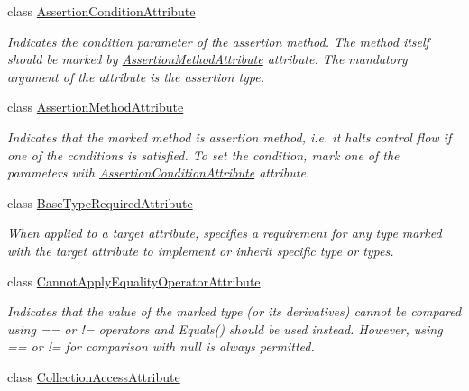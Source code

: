 \begin{DoxyCompactItemize}
\item 
class \mbox{\hyperlink{class_r_f_storage_1_1_assertion_condition_attribute}{Assertion\+Condition\+Attribute}}
\begin{DoxyCompactList}\small\item\em Indicates the condition parameter of the assertion method. The method itself should be marked by \mbox{\hyperlink{class_r_f_storage_1_1_assertion_method_attribute}{Assertion\+Method\+Attribute}} attribute. The mandatory argument of the attribute is the assertion type. \end{DoxyCompactList}\item 
class \mbox{\hyperlink{class_r_f_storage_1_1_assertion_method_attribute}{Assertion\+Method\+Attribute}}
\begin{DoxyCompactList}\small\item\em Indicates that the marked method is assertion method, i.\+e. it halts control flow if one of the conditions is satisfied. To set the condition, mark one of the parameters with \mbox{\hyperlink{class_r_f_storage_1_1_assertion_condition_attribute}{Assertion\+Condition\+Attribute}} attribute. \end{DoxyCompactList}\item 
class \mbox{\hyperlink{class_r_f_storage_1_1_base_type_required_attribute}{Base\+Type\+Required\+Attribute}}
\begin{DoxyCompactList}\small\item\em When applied to a target attribute, specifies a requirement for any type marked with the target attribute to implement or inherit specific type or types. \end{DoxyCompactList}\item 
class \mbox{\hyperlink{class_r_f_storage_1_1_cannot_apply_equality_operator_attribute}{Cannot\+Apply\+Equality\+Operator\+Attribute}}
\begin{DoxyCompactList}\small\item\em Indicates that the value of the marked type (or its derivatives) cannot be compared using \textquotesingle{}==\textquotesingle{} or \textquotesingle{}!=\textquotesingle{} operators and {\ttfamily Equals()} should be used instead. However, using \textquotesingle{}==\textquotesingle{} or \textquotesingle{}!=\textquotesingle{} for comparison with {\ttfamily null} is always permitted. \end{DoxyCompactList}\item 
class \mbox{\hyperlink{class_r_f_storage_1_1_collection_access_attribute}{Collection\+Access\+Attribute}}

\end{DoxyCompactItemize}
